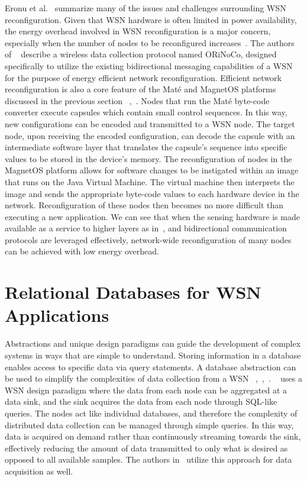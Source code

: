 Eronu et al.~\cite{Eronu} summarize many of the issues and challenges surrounding WSN reconfiguration. Given that WSN hardware is often limited in power availability, the energy overhead involved in WSN reconfiguration is a major concern, especially when the number of nodes to be reconfigured increases~\cite{Eronu}. The authors of ~\cite{Reinhardt} describe a wireless data collection protocol named ORiNoCo, designed specifically to utilize the existing bidirectional messaging capabilities of a WSN for the purpose of energy efficient network reconfiguration. Efficient network reconfiguration is also a core feature of the Mat\'e and MagnetOS platforms discussed in the previous section ~\cite{Levis},~\cite{Barr}. Nodes that run the Mat\'e byte-code converter execute capsules which contain small control sequences. In this way, new configurations can be encoded and transmitted to a WSN node. The target node, upon receiving the encoded configuration, can decode the capsule with an intermediate software layer that translates the capsule's sequence into specific values to be stored in the device's memory. The reconfiguration of nodes in the MagnetOS platform allows for software changes to be instigated within an image that runs on the Java Virtual Machine. The virtual machine then interprets the image and sends the appropriate byte-code values to each hardware device in the network. Reconfiguration of these nodes then becomes no more difficult than executing a new application. We can see that when the sensing hardware is made available as a service to higher layers as in~\cite{Ivester}, and bidirectional communication protocols are leveraged effectively, network-wide reconfiguration of many nodes can be achieved with low energy overhead. 

\section{Relational Databases for WSN Applications}
Abstractions and unique design paradigms can guide the development of complex systems in ways that are simple to understand. Storing information in a database enables access to specific data via query statements. A database abstraction can be used to simplify the complexities of data collection from a WSN ~\cite{Madden},~\cite{Diallo},~\cite{Chagas}. ~\cite{Madden} uses a WSN design paradigm where the data from each node can be aggregated at a data sink, and the sink acquires the data from each node through SQL-like queries. The nodes act like individual databases, and therefore the complexity of distributed data collection can be managed through simple queries. In this way, data is acquired on demand rather than continuously streaming towards the sink, effectively reducing the amount of data transmitted to only what is desired as opposed to all available samples. The authors in~\cite{Chagas} utilize this approach for data acquisition as well.\\

